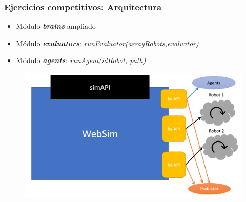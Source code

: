 \documentclass[xcolor={table}]{beamer}
\begin{document}
		\begin{frame}
			\frametitle{\LARGE{Ejercicios competitivos: Arquitectura}}
			\begin{itemize}
			    \item \large{Módulo \textit{\textbf{brains}} ampliado}
			    \item \large{Módulo \textit{\textbf{evaluators}}:} \normalsize{\textit{runEvaluator(arrayRobots,evaluator)}}
	
			    \item \large{Módulo \textit{\textbf{agents}}:} \normalsize{\textit{runAgent(idRobot, path)} }
			   
			\end{itemize}
			\begin{figure}
			    \centering			    \includegraphics[scale=0.22]{img/arquitectura.png}
			\end{figure}
		\end{frame}
		
\end{document}
